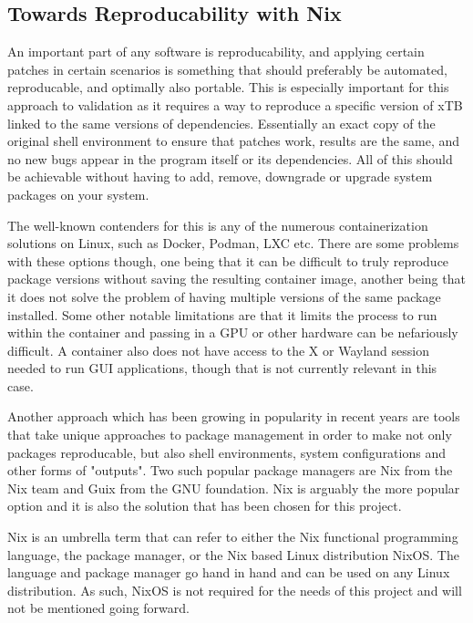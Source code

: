 \subsection{Towards Reproducability with Nix}

An important part of any software is reproducability, and applying certain patches in certain scenarios is something that should preferably be automated, reproducable, and optimally also portable. This is especially important for this approach to validation as it requires a way to reproduce a specific version of xTB linked to the same versions of dependencies. Essentially an exact copy of the original shell environment to ensure that patches work, results are the same, and no new bugs appear in the program itself or its dependencies. All of this should be achievable without having to add, remove, downgrade or upgrade system packages on your system.

The well-known contenders for this is any of the numerous containerization solutions on Linux, such as Docker, Podman, LXC etc. There are some problems with these options though, one being that it can be difficult to truly reproduce package versions without saving the resulting container image, another being that it does not solve the problem of having multiple versions of the same package installed. Some other notable limitations are that it limits the process to run within the container and passing in a GPU or other hardware can be nefariously difficult. A container also does not have access to the X or Wayland session needed to run GUI applications, though that is not currently relevant in this case.

Another approach which has been growing in popularity in recent years are tools that take unique approaches to package management in order to make not only packages reproducable, but also shell environments, system configurations and other forms of "outputs". Two such popular package managers are Nix from the Nix team and Guix from the GNU foundation. Nix is arguably the more popular option and it is also the solution that has been chosen for this project.

Nix is an umbrella term that can refer to either the Nix functional programming language, the package manager, or the Nix based Linux distribution NixOS. The language and package manager go hand in hand and can be used on any Linux distribution. As such, NixOS is not required for the needs of this project and will not be mentioned going forward.

